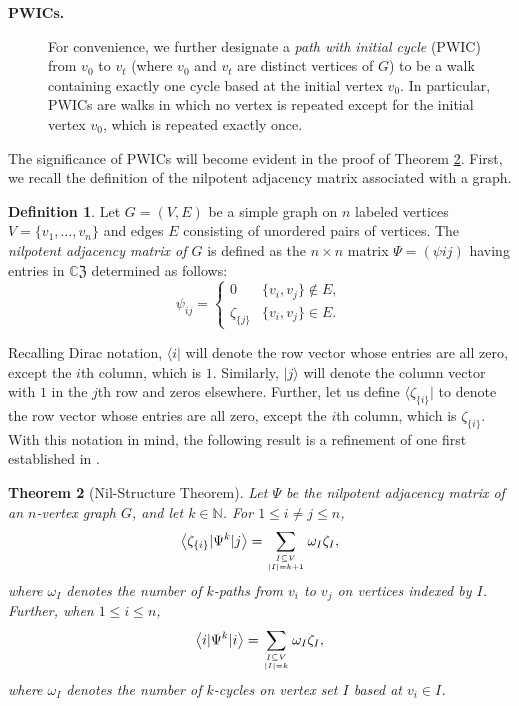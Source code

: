 \documentclass{article}
\newtheorem{theorem}{Theorem}[section]
\theoremstyle{definition}
\newtheorem{definition}[theorem]{Definition}
\newcommand{\CZ}{\mathbb{C}\mathfrak{Z}}
\numberwithin{equation}{section}
\begin{document}
\begin{description}
\item[{\bf PWICs.}] For convenience, we further designate a {\em path with initial cycle} (PWIC)  from $v_0$ to $v_t$ (where $v_0$ and $v_t$ are distinct vertices of $G$) to be a walk containing exactly one cycle based at the initial vertex $v_0$.  In particular, PWICs are walks  in which no vertex is repeated except for the initial vertex $v_0$, which is repeated exactly once.
\end{description}

The significance of PWICs will become evident in the proof of Theorem \ref{nil-structure theorem}.  First, we recall the definition of the nilpotent adjacency matrix associated with a graph.  

\begin{definition}
Let $G=(V,E)$ be a simple graph on $n$ labeled vertices $V=\{v_1, \ldots, v_n\}$ and edges $E$ consisting of unordered pairs of vertices.  The {\em nilpotent adjacency matrix of $G$} is defined as the $n\times n$ matrix $\Psi=(\psi{ij})$ having entries in ${\CZ}$ determined as follows:
\begin{equation*}
\psi_{ij}=\begin{cases}
0&\{v_i, v_j\}\notin E,\\
\zeta_{\{j\}}& \{v_i, v_j\}\in E.
\end{cases}
\end{equation*}
\end{definition}

Recalling Dirac notation,  $\langle i \vert$ will denote the row vector whose entries are all zero, except the $i$th column, which is $1$.  Similarly, $\vert j\rangle$ will denote the column vector with $1$ in the $j$th row and zeros elsewhere.   Further, let us define $\langle \zeta_{\{i\}} \vert$ to denote the row vector whose entries are all zero, except the $i$th column, which is $\zeta_{\{i\}}$.  With this notation in mind, the following result is a refinement of one first established in \cite{ICCA7}.  

\begin{theorem}[Nil-Structure Theorem]\label{nil-structure theorem}
Let $\Psi$ be the nilpotent adjacency matrix of an
$n$-vertex graph $G$, and let $k\in\mathbb{N}$.  For $1\le i\ne j \le n$, 
\begin{equation*}
\left<\zeta_{\{i\}}\vert\Psi^k\vert j\right>=
\sum_{\genfrac{}{}{0pt}{}{I\subseteq V}{|I|=k+1}}\omega_I \zeta_{I},\end{equation*}
where $\omega_I$ denotes the number of $k$-paths from $v_i$ to $v_j$ on vertices indexed by $I$.  Further,  when $1\le i \le n$,
\begin{equation*}
\left<i\vert\Psi^k\vert i\right>=\sum_{\genfrac{}{}{0pt}{}{I\subseteq V}{|I|=k}}\omega_I \zeta_{I},\end{equation*}
where $\omega_I$ denotes the number of $k$-cycles on vertex set $I$ based at $v_i\in I$.  
\end{theorem}
\end{document}
